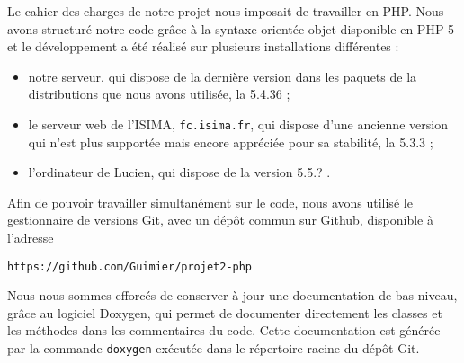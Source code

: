 Le cahier des charges de notre projet nous imposait de travailler en PHP. Nous avons structuré notre code grâce à la syntaxe orientée objet disponible en PHP 5 et le développement a été réalisé sur plusieurs installations différentes :
\begin{itemize}
	\item notre serveur, qui dispose de la dernière version dans les paquets de la distributions que nous avons utilisée, la 5.4.36 ;
	\item le serveur web de l’ISIMA, \texttt{fc.isima.fr}, qui dispose d’une ancienne version qui n’est plus supportée mais encore appréciée pour sa stabilité, la 5.3.3 ;
	\item l’ordinateur de Lucien, qui dispose de la version 5.5.? .
\end{itemize}

Afin de pouvoir travailler simultanément sur le code, nous avons utilisé le gestionnaire de versions Git, avec un dépôt commun sur Github, disponible à l’adresse
\begin{verbatim}
https://github.com/Guimier/projet2-php
\end{verbatim}

Nous nous sommes efforcés de conserver à jour une documentation de bas niveau, grâce au logiciel Doxygen, qui permet de documenter directement les classes et les méthodes dans les commentaires du code. Cette documentation est générée par la commande \texttt{doxygen} exécutée dans le répertoire racine du dépôt Git.

